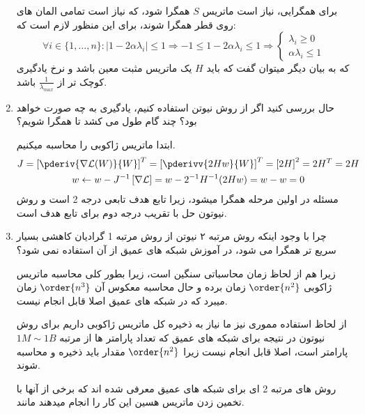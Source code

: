 \begin{enumerate}
{	      \begin{qsolve}[]
		      برای همگرایی، نیاز است ماتریس $S$ همگرا شود، که نیاز است تمامی المان های روی قطر همگرا شوند، برای این منظور لازم است
		      که:
		      \[
			      \forall i\in\{1,\dots,n\}: |1-2\alpha\lambda_i|\leq1\Rightarrow -1\leq 1-2\alpha \lambda_i\leq1
			      \Rightarrow
			      \begin{cases}
				      \lambda_i\geq 0 \\
				      \alpha\lambda_i\leq 1
			      \end{cases}
		      \]
		      که به بیان دیگر میتوان گفت که باید $H$ یک ماتریس مثبت معین باشد و نرخ یادگیری کوچک تر از $\frac{1}{\lambda_{max}}$ باشد.
	      \end{qsolve}
	      }
	      \clearpage
	\item {
	      حال بررسی کنید اگر از روش نیوتن استفاده کنیم، یادگیری به چه صورت خواهد بود؟ چند گام طول می
	      کشد تا همگرا شویم؟

	      \begin{qsolve}[]
            ابتدا ماتریس ژاکوبی را محاسبه میکنیم.
		      \begin{gather*}
                J=\left[\pderiv{\nabla \mathcal{L}(W)}{W}\right]^T=\left[\pderivv{2Hw}{W}\right]^T=\left[2H\right]^2=2H^T=2H\\
                w \leftarrow w - J^{-1}\left[\nabla \mathcal{L}\right]=w-2^{-1}H^{-1}(2Hw)=w-w=0
		      \end{gather*}
              مسئله در اولین مرحله همگرا میشود، زیرا تابع هدف تابعی درجه 2 است و روش نیوتون حل با تقریب 
              درجه دوم برای تابع هدف است.
	      \end{qsolve}
	      }
	\item {
	      چرا با وجود اینکه روش مرتبه ۲ نیوتن از روش مرتبه 1 گرادیان کاهشی بسیار سریع تر همگرا می شود،
	      در آموزش شبکه های عمیق از آن استفاده نمی شود؟

          \begin{qsolve}[]
            زیرا هم از لحاظ زمان محاسباتی سنگین است، زیرا بطور کلی محاسبه ماتریس ژاکوبی $\order{n^2}$
            زمان برده و حال محاسبه معکوس آن $\order{n^3}$ زمان میبرد که در شبکه های عمیق اصلا قابل انجام نیست.

            از لحاظ استفاده مموری نیز ما نیاز به ذخیره کل ماتریس ژاکوبی داریم برای روش نیوتون در نتیجه برای شبکه های عمیق که تعداد پارامتر 
            ها از مرتبه $1M\sim 1B$ پارامتر است، اصلا قابل انجام نیست زیرا $\order{n^2}$ مقدار باید ذخیره و محاسبه شوند.

            روش های مرتبه 2 ای برای شبکه های عمیق معرفی شده اند که برخی از آنها با تخمین زدن ماتریس هسین این کار را انجام میدهند مانند. 
            \cite{yao2021adahessian}
          \end{qsolve}
	      }
\end{enumerate}